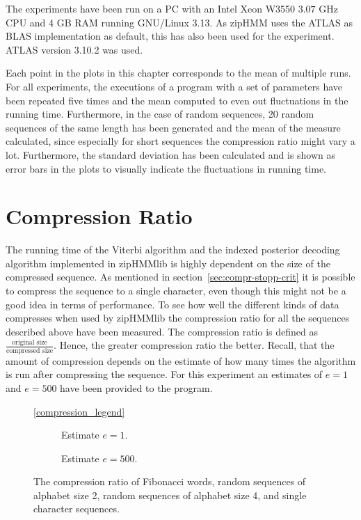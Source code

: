 The experiments have been run on a PC with an Intel Xeon W3550 $3.07$ GHz CPU
and 4 GB RAM running GNU/Linux 3.13. As zipHMM uses the ATLAS as BLAS
implementation as default, this has also been used for the experiment. ATLAS
version 3.10.2 was used.

Each point in the plots in this chapter corresponds to the mean of multiple
runs. For all experiments, the executions of a program with a set of parameters
have been repeated five times and the mean computed to even out fluctuations in
the running time. Furthermore, in the case of random sequences, 20 random
sequences of the same length has been generated and the mean of the measure
calculated, since especially for short sequences the compression ratio might vary
a lot. Furthermore, the standard deviation has been calculated and is shown as
error bars in the plots to visually indicate the fluctuations in running time.


\section{Compression Ratio}
\label{sec:compression-ratio}

The running time of the Viterbi algorithm and the indexed posterior decoding
algorithm implemented in zipHMMlib is highly dependent on the size of the
compressed sequence. As mentioned in section~\ref{sec:compr-stopp-crit} it is
possible to compress the sequence to a single character, even though this might
not be a good idea in terms of performance. To see how well the different kinds
of data compresses when used by zipHMMlib the compression ratio for all the
sequences described above have been measured. The compression ratio is defined
as $\frac{\text{original size}}{\text{compressed size}}$. Hence, the greater
compression ratio the better. Recall, that the amount of compression depends on
the estimate of how many times the algorithm is run after compressing the
sequence. For this experiment an estimates of $e = 1$ and $e = 500$ have been
provided to the program.

\begin{figure}
  \centering\ref{compression_legend}
  \begin{subfigure}[b]{0.5\textwidth}
    \centering 
    \caption{Estimate $e = 1$.}
  \end{subfigure}%
  \begin{subfigure}[b]{0.5\textwidth}
    \centering 
    \caption{Estimate $e = 500$.}
  \end{subfigure}
  \caption{The compression ratio of Fibonacci words, random sequences of
    alphabet size 2, random sequences of alphabet size 4, and single character
    sequences.}
  \label{fig:compression_ratio}
\end{figure}

